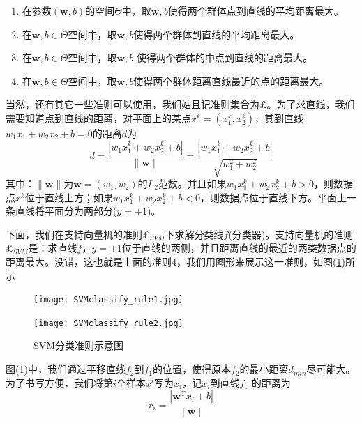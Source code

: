 	\begin{enumerate}
	    \item 在参数$(\mathbf w,b)$的空间$\Theta$中，取$\mathbf w,b$使得两个群体点到直线的平均距离最大。
	    \item 在$\mathbf w,b\in \Theta$空间中，取$\mathbf w,b$使得两个群体到直线的平均距离最大。
	    \item 在$\mathbf w,b\in \Theta$空间中，取$\mathbf w,b$ 使得两个群体的中点到直线的距离最大。
	    \item 在$\mathbf w,b\in \Theta$空间中，取$\mathbf w,b$使得两个群体距离直线最近的点的距离最大。
	\end{enumerate}
	\par
	当然，还有其它一些准则可以使用，我们姑且记准则集合为$\pounds$。为了求直线，我们需要知道点到直线的距离，对平面上的某点$x^k=(x_1^k,x_2^k)$，其到直线$w_1x_1+w_2x_2+b=0$的距离$d$为
	\[
	d=\frac{| w_1x_1^k+w_2x_2^k+b| }{\|\mathbf w\|} = \frac{| w_1x_1^k+w_2x_2^k+b| }{\sqrt {w_1^2+w_2^2}}
	\]
	其中：$\|\mathbf w\|$为$\mathbf w=(w_1,w_2)$的$L_2$范数。并且如果$w_1x_1^k+w_2x_2^k+b>0$，则数据点$x^k$位于直线上方；如果$w_1x_1^k+w_2x_2^k+b<0$，则数据点位于直线下方。平面上一条直线将平面分为两部分($y=\pm 1$)。
	\par
	下面，我们在支持向量机的准则$\pounds _{SVM}$下求解分类线$f$(分类器)。支持向量机的准则$\pounds _{SVM}$是：求直线$f$，$y=\pm 1$位于直线的两侧，并且距离直线的最近的两类数据点的距离最大。没错，这也就是上面的准则4，我们用图形来展示这一准则，如图(\ref{fig:SVM分类准则示意图})所示
		\begin{figure}[H]
		\centering
		\begin{varwidth}[t]{\textwidth}
		\vspace{0pt}
		\texttt{[image: SVMclassify\_rule1.jpg]}
		\end{varwidth}
		\qquad
		\begin{varwidth}[t]{\textwidth}
		\vspace{0pt}
		\texttt{[image: SVMclassify\_rule2.jpg]}
		\end{varwidth}
		\caption{SVM分类准则示意图}
		\label{fig:SVM分类准则示意图}
		\end{figure}
	图(\ref{fig:SVM分类准则示意图})中，我们通过平移直线$f_2$到$f_1$的位置，使得原本$f_2$的最小距离$d_{min}$尽可能大。为了书写方便，我们将第$i$个样本$x^i$写为$x_i$，记$x_i$到直线$f_1$ 的距离为
	\[
	r_i=\frac{|\mathbf w^ \mathrm{ T } x_i+b |}{||\mathbf w||}
	\]

